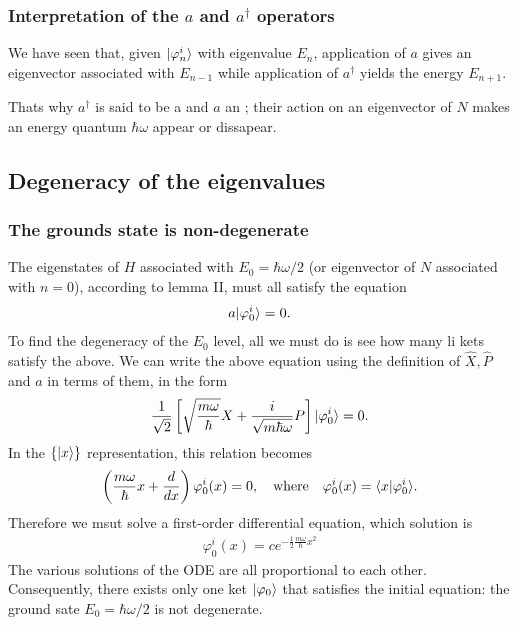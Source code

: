 \subsubsection{Interpretation of the $a$ and $a^\dagger$ operators}
We have seen that, given $|\varphi_n^i\rangle$ with eigenvalue $E_n$, application of $a$ gives an eigenvector associated with $E_{n-1}$ while 
application of $a^\dagger$ yields the energy $E_{n+1}$.

Thats why $a^\dagger$ is said to be a  and $a$ an ; their action on an eigenvector of $N$ makes 
an energy quantum $\hbar\omega$ appear or dissapear.

\subsection{Degeneracy of the eigenvalues}
%
\subsubsection{The grounds state is non-degenerate}
The eigenstates of $H$ associated with $E_0=\hbar\omega/2$ (or eigenvector of $N$ associated with $n=0$), according to lemma II,
must all satisfy the equation
\begin{align*}
    a|\varphi_0^i\rangle=0.
\end{align*}
To find the degeneracy of the $E_0$ level, all we must do is see how many li kets satisfy the above.
We can write the above equation using the definition of $\hat{X},\hat{P}$ and $a$ in terms of them, in the form 
\begin{align*}
    \frac{1}{\sqrt{2}}\left[\sqrt{\frac{m\omega}{\hbar}}X+\frac{i}{\sqrt{m\hbar\omega}}P\right]|\varphi_0^i\rangle=0.
\end{align*}
In the $\{|x\rangle\}$ representation, this relation becomes
\begin{align*}
    \left(\frac{m\omega}{\hbar}x+\frac{d}{dx}\right)\varphi_0^i(x)=0,\quad\text{where}\quad\varphi_0^i(x)=\langle x|\varphi_0^i\rangle.
\end{align*}
Therefore we msut solve a first-order differential equation, which solution is 
\begin{align}
    \varphi_0^i(x)=ce^{-\frac{1}{2}\frac{m\omega}{\hbar}x^2}
\end{align}
The various solutions of the ODE are all proportional to each other. Consequently, there exists only one ket $|\varphi_0\rangle$ that satisfies 
the initial equation: the ground sate $E_0=\hbar\omega/2$ is not degenerate.
%
